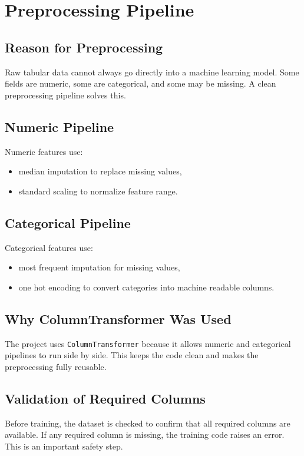 \documentclass[12pt,a4paper,openany]{report}
\begin{document}
    \chapter{Preprocessing Pipeline}
    \section{Reason for Preprocessing}
    Raw tabular data cannot always go directly into a machine learning model. Some fields are numeric, some are categorical, and some may be missing. A clean preprocessing pipeline solves this.

    \section{Numeric Pipeline}
    Numeric features use:
    \begin{itemize}[leftmargin=1.4cm]
    \item median imputation to replace missing values,
    \item standard scaling to normalize feature range.
    \end{itemize}

    \section{Categorical Pipeline}
    Categorical features use:
    \begin{itemize}[leftmargin=1.4cm]
    \item most frequent imputation for missing values,
    \item one hot encoding to convert categories into machine readable columns.
    \end{itemize}

    \section{Why ColumnTransformer Was Used}
    The project uses \texttt{ColumnTransformer} because it allows numeric and categorical pipelines to run side by side. This keeps the code clean and makes the preprocessing fully reusable.

    \section{Validation of Required Columns}
    Before training, the dataset is checked to confirm that all required columns are available. If any required column is missing, the training code raises an error. This is an important safety step.
\end{document}

